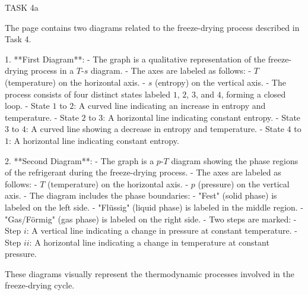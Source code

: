 TASK 4a

The page contains two diagrams related to the freeze-drying process described in Task 4.

1. **First Diagram**:
   - The graph is a qualitative representation of the freeze-drying process in a \( T \)-\( s \) diagram.
   - The axes are labeled as follows:
     - \( T \) (temperature) on the horizontal axis.
     - \( s \) (entropy) on the vertical axis.
   - The process consists of four distinct states labeled \( 1 \), \( 2 \), \( 3 \), and \( 4 \), forming a closed loop. 
     - State \( 1 \) to \( 2 \): A curved line indicating an increase in entropy and temperature.
     - State \( 2 \) to \( 3 \): A horizontal line indicating constant entropy.
     - State \( 3 \) to \( 4 \): A curved line showing a decrease in entropy and temperature.
     - State \( 4 \) to \( 1 \): A horizontal line indicating constant entropy.

2. **Second Diagram**:
   - The graph is a \( p \)-\( T \) diagram showing the phase regions of the refrigerant during the freeze-drying process.
   - The axes are labeled as follows:
     - \( T \) (temperature) on the horizontal axis.
     - \( p \) (pressure) on the vertical axis.
   - The diagram includes the phase boundaries:
     - "Fest" (solid phase) is labeled on the left side.
     - "Flüssig" (liquid phase) is labeled in the middle region.
     - "Gas/Förmig" (gas phase) is labeled on the right side.
   - Two steps are marked:
     - Step \( i \): A vertical line indicating a change in pressure at constant temperature.
     - Step \( ii \): A horizontal line indicating a change in temperature at constant pressure.

These diagrams visually represent the thermodynamic processes involved in the freeze-drying cycle.